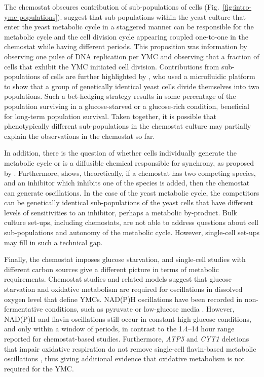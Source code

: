 The chemostat obscures contribution of sub-populations of cells (Fig.\ \ref{fig:intro-ymc-populations}).
\textcite{burnettiCellCycleStart2016} suggest that sub-populations within the yeast culture that enter the yeast metabolic cycle in a staggered manner can be responsible for the metabolic cycle and the cell division cycle appearing coupled one-to-one in the chemostat while having different periods.
This proposition was information by observing one pulse of DNA replication per YMC and observing that a fraction of cells that exhibit the YMC initiated cell division.
Contributions from sub-populations of cells are further highlighted by \textcite{bagameryPutativeBetHedgingStrategy2020}, who used a microfluidic platform to show that a group of genetically identical yeast cells divide themselves into two populations.
Such a bet-hedging strategy results in some percentage of the population surviving in a glucose-starved or a glucose-rich condition, beneficial for long-term population survival.
Taken together, it is possible that phenotypically different sub-populations in the chemostat culture may partially explain the observations in the chemostat so far.

In addition, there is the question of whether cells individually generate the metabolic cycle or is a diffusible chemical responsible for synchrony, as proposed by \textcite{krishnaMinimalPushPull2018}.
Furthermore, \textcite{smithTheoryChemostatDynamics1995} shows, theoretically, if a chemostat has two competing species, and an inhibitor which inhibits one of the species is added, then the chemostat can generate oscillations.
In the case of the yeast metabolic cycle, the competitors can be genetically identical sub-populations of the yeast cells that have different levels of sensitivities to an inhibitor, perhaps a metabolic by-product.
Bulk culture set-ups, including chemostats, are not able to address questions about cell sub-populations and autonomy of the metabolic cycle.
However, single-cell set-ups may fill in such a technical gap.

Finally, the chemostat imposes glucose starvation, and single-cell studies with different carbon sources give a different picture in terms of metabolic requirements.
Chemostat studies and related models suggest that glucose starvation and oxidative metabolism are required for oscillations in dissolved oxygen level that define YMCs.
NAD(P)H oscillations have been recorded in non-fermentative conditions, such as pyruvate or low-glucose media \parencite{papagiannakisAutonomousMetabolicOscillations2017}.
However, NAD(P)H \parencite{papagiannakisAutonomousMetabolicOscillations2017,ozsezenInferenceHighLevelInteraction2019} and flavin \parencite{baumgartnerFlavinbasedMetabolicCycles2018} oscillations still occur in constant high-glucose conditions, and only within a window of periods, in contrast to the 1.4--14 hour range reported for chemostat-based studies.
Furthermore, \textit{ATP5} and \textit{CYT1} deletions that impair oxidative respiration do not remove single-cell flavin-based metabolic oscillations \parencite{baumgartnerFlavinbasedMetabolicCycles2018}, thus giving additional evidence that oxidative metabolism is not required for the YMC\@.

